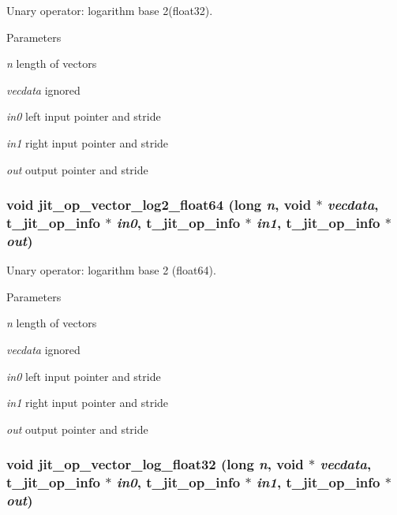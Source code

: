 Unary operator: logarithm base 2(float32). 
\begin{DoxyParams}{Parameters}
\item[{\em n}]length of vectors \item[{\em vecdata}]ignored \item[{\em in0}]left input pointer and stride \item[{\em in1}]right input pointer and stride \item[{\em out}]output pointer and stride \end{DoxyParams}
\hypertarget{group__opvecmod_ga85c60d306d73bb29cf675c6d1da91e44}{
\subsubsection[{jit\_\-op\_\-vector\_\-log2\_\-float64}]{\setlength{\rightskip}{0pt plus 5cm}void jit\_\-op\_\-vector\_\-log2\_\-float64 (long {\em n}, \/  void $\ast$ {\em vecdata}, \/  {\bf t\_\-jit\_\-op\_\-info} $\ast$ {\em in0}, \/  {\bf t\_\-jit\_\-op\_\-info} $\ast$ {\em in1}, \/  {\bf t\_\-jit\_\-op\_\-info} $\ast$ {\em out})}}
\label{group__opvecmod_ga85c60d306d73bb29cf675c6d1da91e44}


Unary operator: logarithm base 2 (float64). 
\begin{DoxyParams}{Parameters}
\item[{\em n}]length of vectors \item[{\em vecdata}]ignored \item[{\em in0}]left input pointer and stride \item[{\em in1}]right input pointer and stride \item[{\em out}]output pointer and stride \end{DoxyParams}
\hypertarget{group__opvecmod_ga824a2770fb804d1a31a53465bbcc15a6}{
\subsubsection[{jit\_\-op\_\-vector\_\-log\_\-float32}]{\setlength{\rightskip}{0pt plus 5cm}void jit\_\-op\_\-vector\_\-log\_\-float32 (long {\em n}, \/  void $\ast$ {\em vecdata}, \/  {\bf t\_\-jit\_\-op\_\-info} $\ast$ {\em in0}, \/  {\bf t\_\-jit\_\-op\_\-info} $\ast$ {\em in1}, \/  {\bf t\_\-jit\_\-op\_\-info} $\ast$ {\em out})}}
\label{group__opvecmod_ga824a2770fb804d1a31a53465bbcc15a6}


